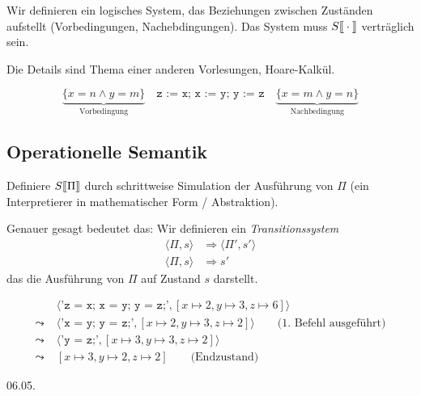 Wir definieren ein logisches System, das Beziehungen zwischen Zuständen aufstellt (Vorbedingungen, Nachebdingungen). Das System muss $S\mathrm{[}\kern-.14em\mathrm{[}\cdot\mathrm{]}\kern-.14em\mathrm{]}$ verträglich sein.

Die Details sind Thema einer anderen Vorlesungen, \zb Hoare-Kalkül.

\begin{example}
    \[
    \underbrace{\{ x = n \wedge y = m \}}_{\text{Vorbedingung}} \quad \texttt{z := x; x := y; y := z} \quad \underbrace{\{ x = m \wedge y = n \}}_{\text{Nachbedingung}}
    \]
\end{example}



\subsection{Operationelle Semantik}

Definiere $S\mathrm{[}\kern-.14em\mathrm{[}\Pi\mathrm{]}\kern-.14em\mathrm{]}$ durch schrittweise Simulation der Ausführung von $\Pi$ (ein Interpretierer in mathematischer Form / Abstraktion).

Genauer gesagt bedeutet das: Wir definieren ein \emph{Transitionssystem}
\begin{align*}
    \langle \Pi, s \rangle & \Rightarrow \langle \Pi', s' \rangle \\
    \langle \Pi, s \rangle & \Rightarrow s'
\end{align*}
das die Ausführung von $\Pi$ auf Zustand $s$ darstellt.

\begin{example}
    \begin{align*}
        & \langle \texttt{'z = x; x = y; y = z;'}, [x \mapsto 2, y \mapsto 3, z \mapsto 6] \rangle \\
        \leadsto \; & \langle \texttt{'x = y; y = z;'}, [x \mapsto 2, y \mapsto 3, z \mapsto 2] \rangle \quad\quad \text{(1. Befehl ausgeführt)} \\
        \leadsto \; & \langle \texttt{'y = z;'}, [x \mapsto 3, y \mapsto 3, z \mapsto 2] \rangle \\
        \leadsto \; & [x \mapsto 3, y \mapsto 2, z \mapsto 2] \quad\quad \text{(Endzustand)}
    \end{align*}
\end{example}



\newpage
\hfill 06.05.


